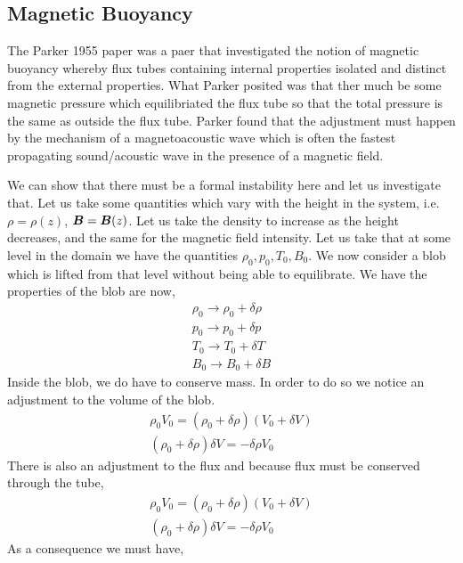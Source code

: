 \documentclass{article}
\begin{document}
\subsection{Magnetic Buoyancy}
The Parker 1955 paper was a paer that investigated the notion of magnetic
buoyancy whereby flux tubes containing internal properties isolated and
distinct from the
external properties. What Parker posited was that ther much be some magnetic
pressure which equilibriated the flux tube so that the total pressure is
the same as outside the flux tube. Parker found that the adjustment must
happen by the mechanism of a magnetoacoustic wave which is often the fastest
propagating sound/acoustic wave in the presence of a magnetic field. 

We can show that there must be a formal instability here and let us investigate
that. Let us take some quantities which vary with the height in the system, i.e.
$\rho = \rho(z)$, $\boldsymbol{B} = \boldsymbol{B}(z)$. Let us take the density to increase as the
height decreases, and the same for the magnetic field intensity. Let us take
that at some level in the domain we have the quantities $\rho_0, p_0, T_0, B_0$.
We now consider a blob which is lifted from that level without being able to
equilibrate. We have the properties of the blob are now, 
\begin{gather*}
    \rho_0 \to \rho_0 + \delta \rho\\ p_0\to p_0 + \delta p\\ T_0\to T_0 +
    \delta T\\ B_0\to B_0 + \delta B
\end{gather*}
Inside the blob, we do have to conserve mass. In order to do so we notice an
adjustment to the volume of the blob. 
\begin{gather*}
    \rho_0V_0 = (\rho_0+\delta\rho)(V_0+\delta V)\\
    (\rho_0+\delta\rho)\delta V = -\delta\rho V_0
\end{gather*}
There is also an adjustment to the flux and because flux must be conserved
through the tube, 
\begin{gather*}
    \rho_0V_0 = (\rho_0+\delta\rho)(V_0+\delta V)\\
    (\rho_0+\delta\rho)\delta V = -\delta\rho V_0
\end{gather*}
As a consequence we must have, 
\end{document}
